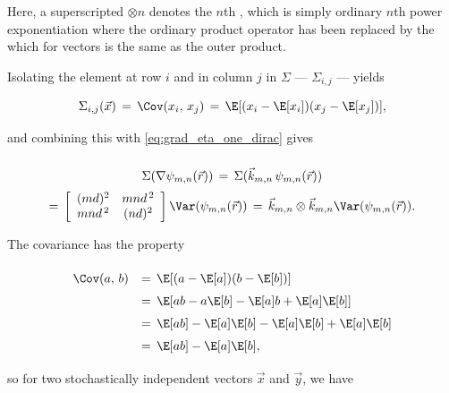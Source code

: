 Here, a superscripted $\otimes n$ denotes the $n$th , which is simply ordinary $n$th power exponentiation where the ordinary product operator has been replaced by the  which for vectors is the same as the outer product.

Isolating the element at row $i$ and in column $j$ in $\Sigma$ --- $\Sigma_{i,j}$ --- yields

\begin{equation} \label{eq:covariance_matrix_element}
\Sigma_{i,j}(\vec{x}) \,=\, \Cov(x_i,\,x_j) \,=\, \E[(x_i - \E[x_i])(x_j - \E[x_j])],
\end{equation}

and combining this with \eqref{eq:grad_eta_one_dirac} gives

\begin{equation} \label{eq:covariance_matrix_gradient_eta_mn}
\renewcommand*{\arraystretch}{2}
\begin{array}{c}
\Sigma(\nabla\psi_{m,n}(\vec{r})) \,=\, \Sigma(\vec{k}_{m,n}\,\psi_{m,n}(\vec{r})) \\
=\,
\left[\renewcommand*{\arraystretch}{1}
\begin{array}{cc}
(md)^2 & mnd^{\,2} \\
mnd^{\,2} & (nd)^2
\end{array}
\right]
\Var(\psi_{m,n}(\vec{r})) \,=\, \vec{k}_{m,n}\otimes\vec{k}_{m,n} \Var(\psi_{m,n}(\vec{r})).
\end{array}
\end{equation}

The covariance has the property

\begin{equation}
\renewcommand*{\arraystretch}{1.5}
\begin{array}{rl}
\Cov(a,\,b)
& =\, \E[(a-\E[a])(b-\E[b])] \\
& =\, \E[ab - a\E[b] - \E[a]b + \E[a]\E[b]] \\
& =\, \E[ab] - \E[a]\E[b] - \E[a]\E[b] + \E[a]\E[b] \\
& =\, \E[ab] - \E[a]\E[b],
\end{array}
\end{equation}

so for two stochastically independent vectors $\vec{x}$ and $\vec{y}$, we have

